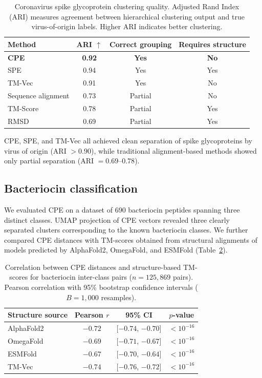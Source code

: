 \documentclass[11pt]{article}
\begin{document}
\begin{table}[H]
\centering
\caption{Coronavirus spike glycoprotein clustering quality. Adjusted Rand Index (ARI) measures agreement between hierarchical clustering output and true virus-of-origin labels. Higher ARI indicates better clustering.}
\label{tab:corona}
\begin{tabular}{lccc}
\toprule
\textbf{Method} & \textbf{ARI} $\uparrow$ & \textbf{Correct grouping} & \textbf{Requires structure} \\
\midrule
\textbf{CPE} & \textbf{0.92} & \textbf{Yes} & \textbf{No} \\
SPE & 0.94 & Yes & Yes \\
TM-Vec & 0.91 & Yes & No \\
Sequence alignment & 0.73 & Partial & No \\
TM-Score & 0.78 & Partial & Yes \\
RMSD & 0.69 & Partial & Yes \\
\bottomrule
\end{tabular}
\end{table}

CPE, SPE, and TM-Vec all achieved clean separation of spike glycoproteins by virus of origin (ARI $> 0.90$), while traditional alignment-based methods showed only partial separation (ARI $= 0.69$--$0.78$).

\subsection{Bacteriocin classification}

We evaluated CPE on a dataset of 690 bacteriocin peptides spanning three distinct classes. UMAP projection of CPE vectors revealed three clearly separated clusters corresponding to the known bacteriocin classes. We further compared CPE distances with TM-scores obtained from structural alignments of models predicted by AlphaFold2, OmegaFold, and ESMFold (Table~\ref{tab:bacteriocin}).

\begin{table}[H]
\centering
\caption{Correlation between CPE distances and structure-based TM-scores for bacteriocin inter-class pairs ($n = 125{,}869$ pairs). Pearson correlation with 95\% bootstrap confidence intervals ($B = 1{,}000$ resamples).}
\label{tab:bacteriocin}
\begin{tabular}{lccc}
\toprule
\textbf{Structure source} & \textbf{Pearson $r$} & \textbf{95\% CI} & \textbf{$p$-value} \\
\midrule
AlphaFold2 & $-0.72$ & [$-0.74$, $-0.70$] & $< 10^{-16}$ \\
OmegaFold & $-0.69$ & [$-0.71$, $-0.67$] & $< 10^{-16}$ \\
ESMFold & $-0.67$ & [$-0.70$, $-0.64$] & $< 10^{-16}$ \\
TM-Vec & $-0.74$ & [$-0.76$, $-0.72$] & $< 10^{-16}$ \\
\bottomrule
\end{tabular}
\end{table}
\end{document}

